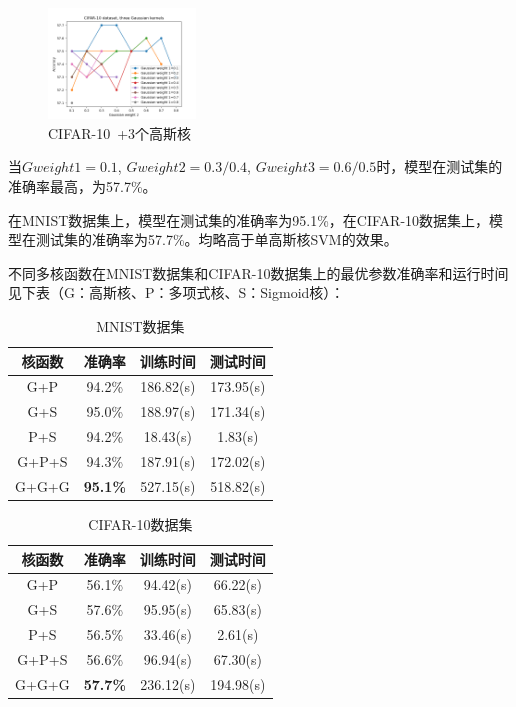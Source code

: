 \documentclass[a4paper]{article}
\begin{document}
\begin{figure}[H]
    \centering
    \includegraphics[width=0.35\textwidth]{pictures/multi kernel/CIFAR10+3高斯核.png}
    \caption{CIFAR-10\ +3个高斯核}
\end{figure}
当$Gweight1=0.1$, $Gweight2=0.3/0.4$, $Gweight3=0.6/0.5$时，模型在测试集的准确率最高，为57.7\%。


在MNIST数据集上，模型在测试集的准确率为95.1\%，在CIFAR-10数据集上，模型在测试集的准确率为57.7\%。均略高于单高斯核SVM的效果。

不同多核函数在MNIST数据集和CIFAR-10数据集上的最优参数准确率和运行时间见下表（G：高斯核、P：多项式核、S：Sigmoid核）：
\begin{table}[H]
  \caption{MNIST数据集}
  \centering
  \begin{tabular}{ c c c c }
    \toprule
    \textbf{核函数} & \textbf{准确率} & \textbf{训练时间} & \textbf{测试时间} \\
    \midrule
    G+P & 94.2\% & 186.82(s) & 173.95(s) \\
    G+S & 95.0\% & 188.97(s) & 171.34(s) \\
    P+S & 94.2\% & 18.43(s) & 1.83(s) \\
    G+P+S & 94.3\% & 187.91(s) & 172.02(s) \\
    G+G+G & \textbf{95.1\%} & 527.15(s) & 518.82(s) \\
    \bottomrule
  \end{tabular}
\end{table}

\begin{table}[H]
  \caption{CIFAR-10数据集}
  \centering
  \begin{tabular}{ c c c c }
    \toprule
    \textbf{核函数} & \textbf{准确率} & \textbf{训练时间} & \textbf{测试时间}\\
    \midrule
    G+P & 56.1\% & 94.42(s) & 66.22(s) \\
    G+S & 57.6\% & 95.95(s) & 65.83(s) \\
    P+S & 56.5\% & 33.46(s) & 2.61(s) \\
    G+P+S & 56.6\% & 96.94(s) & 67.30(s) \\
    G+G+G & \textbf{57.7\%} & 236.12(s) & 194.98(s) \\
    \bottomrule
  \end{tabular}
\end{table}
\end{document}
